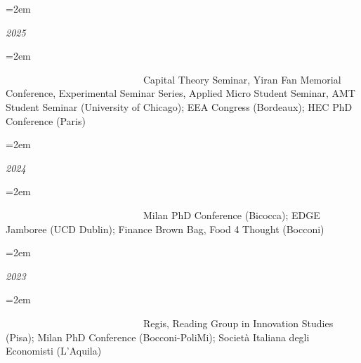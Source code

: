 \documentclass{scrartcl}
\newcommand{\MarginText}[1]{\marginpar{\raggedleft\itshape\small#1}} %
\newlength{\datebox}\settowidth{\datebox}{Spring 2011} %
\newcommand{\NewEntry}[3]{\noindent\hangindent=2em\hangafter=0 \parbox{\datebox}{\small \textit{#1}}\hspace{1.5em} #2 #3 %
\vspace{0.5em}} %
\newcommand{\Description}[1]{\hangindent=2em\hangafter=0\noindent\raggedright\footnotesize{#1}\par\normalsize\vspace{1em}} %
\begin{document}
\begin{cv}{}





\vspace{1em}

\NewEntry{2025}{}

\vspace{-1.5em}
\Description{\MarginText{}
\ \ \ \ \ \ \ \ \ \ \ \ \ \ \ \ \ \ \ \  \ \ \ \ \ \ \ \  {Capital Theory Seminar, Yiran Fan Memorial Conference, Experimental Seminar Series, Applied Micro Student Seminar, AMT Student Seminar (University of Chicago); EEA Congress (Bordeaux); HEC PhD Conference (Paris)}}%



\NewEntry{2024}{}

\vspace{-1.5em}
\Description{\MarginText{}
\ \ \ \ \ \ \ \ \ \ \ \ \ \ \ \ \ \ \ \  \ \ \ \ \ \ \ \  {Milan PhD Conference (Bicocca); EDGE Jamboree (UCD Dublin); Finance Brown Bag, Food 4 Thought (Bocconi)}}%


\NewEntry{2023}{}

\vspace{-1.5em}
\Description{\MarginText{}  
\ \ \ \ \ \ \ \ \ \ \ \ \ \ \ \ \ \ \ \  \ \ \ \ \ \ \ \  {Regis, Reading Group in Innovation Studies (Pisa); Milan PhD Conference (Bocconi-PoliMi); Società Italiana degli Economisti (L'Aquila)}}%





\end{cv}
\end{document}
